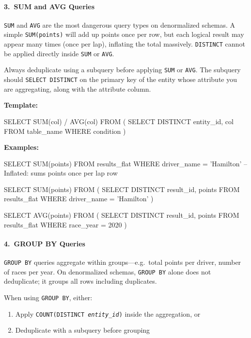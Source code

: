 \begin{tcolorbox}[
  colback=gray!5,
  colframe=gray!20,
  arc=4pt,
  boxrule=0.5pt,
  breakable,
  left=8pt,
  right=8pt,
  top=8pt,
  bottom=8pt,
  nobeforeafter,
]
\tcbline
\paragraph{3.\ SUM and AVG Queries}
\texttt{SUM} and \texttt{AVG} are the most dangerous query types on denormalized schemas.
A simple \texttt{SUM(points)} will add up points once per row, but each logical result may appear many times (once per lap), inflating the total massively.
\texttt{DISTINCT} cannot be applied directly inside \texttt{SUM} or \texttt{AVG}.

\denormrule Always deduplicate using a subquery before applying \texttt{SUM} or \texttt{AVG}.
The subquery should \texttt{SELECT DISTINCT} on the primary key of the entity whose attribute you are aggregating, along with the attribute column.

\noindent\textbf{Template:}
\begin{sqlneutral}
SELECT SUM(col) / AVG(col)
FROM (
  SELECT DISTINCT entity_id, col
  FROM table_name
  WHERE condition
)
\end{sqlneutral}

\noindent\textbf{Examples:}

\begin{sqlwrong}
SELECT SUM(points) FROM results_flat
  WHERE driver_name = 'Hamilton'
  -- Inflated: sums points once per lap row
\end{sqlwrong}
\begin{sqlcorrect}
SELECT SUM(points) FROM (
  SELECT DISTINCT result_id, points
  FROM results_flat
  WHERE driver_name = 'Hamilton'
)
\end{sqlcorrect}

\begin{sqlcorrect}
SELECT AVG(points) FROM (
  SELECT DISTINCT result_id, points
  FROM results_flat
  WHERE race_year = 2020
)
\end{sqlcorrect}

\tcbline
\paragraph{4.\ GROUP BY Queries}
\texttt{GROUP BY} queries aggregate within groups---e.g.\ total points per driver, number of races per year.
On denormalized schemas, \texttt{GROUP BY} alone does not deduplicate; it groups all rows including duplicates.

\denormrule When using \texttt{GROUP BY}, either:
\begin{enumerate}
  \item Apply \texttt{COUNT(DISTINCT \textit{entity\_id})} inside the aggregation, or
  \item Deduplicate with a subquery before grouping
\end{enumerate}


\end{tcolorbox}

